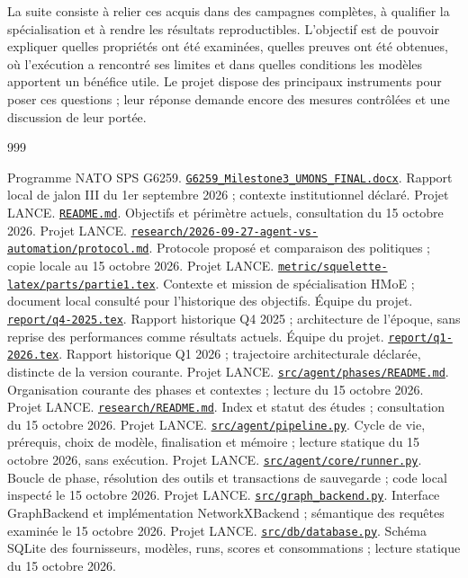 \documentclass[11pt,a4paper]{article}
\newcommand{\source}[2]{\href{../../#1}{\nolinkurl{#1}}. #2}
\begin{document}
La suite consiste à relier ces acquis dans des campagnes complètes, à qualifier
la spécialisation et à rendre les résultats reproductibles. L'objectif est de
pouvoir expliquer quelles propriétés ont été examinées, quelles preuves ont
été obtenues, où l'exécution a rencontré ses limites et dans quelles conditions
les modèles apportent un bénéfice utile. Le projet dispose des principaux
instruments pour poser ces questions ; leur réponse demande encore des
mesures contrôlées et une discussion de leur portée.

\begin{thebibliography}{999}
\small{}
 Programme NATO SPS G6259. \source{G6259_Milestone3_UMONS_FINAL.docx}{Rapport local de jalon III du 1er septembre 2026 ; contexte institutionnel déclaré.}
 Projet LANCE. \source{README.md}{Objectifs et périmètre actuels, consultation du 15 octobre 2026.}
 Projet LANCE. \source{research/2026-09-27-agent-vs-automation/protocol.md}{Protocole proposé et comparaison des politiques ; copie locale au 15 octobre 2026.}
 Projet LANCE. \source{metric/squelette-latex/parts/partie1.tex}{Contexte et mission de spécialisation HMoE ; document local consulté pour l'historique des objectifs.}
 Équipe du projet. \source{report/q4-2025.tex}{Rapport historique Q4 2025 ; architecture de l'époque, sans reprise des performances comme résultats actuels.}
 Équipe du projet. \source{report/q1-2026.tex}{Rapport historique Q1 2026 ; trajectoire architecturale déclarée, distincte de la version courante.}
 Projet LANCE. \source{src/agent/phases/README.md}{Organisation courante des phases et contextes ; lecture du 15 octobre 2026.}
 Projet LANCE. \source{research/README.md}{Index et statut des études ; consultation du 15 octobre 2026.}
 Projet LANCE. \source{src/agent/pipeline.py}{Cycle de vie, prérequis, choix de modèle, finalisation et mémoire ; lecture statique du 15 octobre 2026, sans exécution.}
 Projet LANCE. \source{src/agent/core/runner.py}{Boucle de phase, résolution des outils et transactions de sauvegarde ; code local inspecté le 15 octobre 2026.}
 Projet LANCE. \source{src/graph_backend.py}{Interface GraphBackend et implémentation NetworkXBackend ; sémantique des requêtes examinée le 15 octobre 2026.}
 Projet LANCE. \source{src/db/database.py}{Schéma SQLite des fournisseurs, modèles, runs, scores et consommations ; lecture statique du 15 octobre 2026.}

\end{thebibliography}
\end{document}
